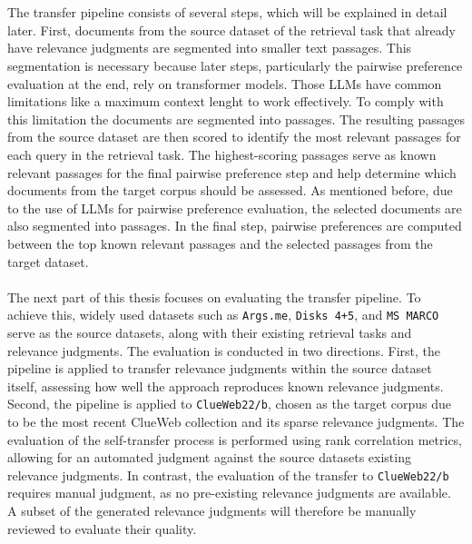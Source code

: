 \\\\
The transfer pipeline consists of several steps, which will be explained in detail later. First, documents from the source dataset of the retrieval task that already have relevance judgments are segmented into smaller text passages. This segmentation is necessary because later steps, particularly the pairwise preference evaluation at the end, rely on transformer models. Those LLMs have common limitations like a maximum context lenght to work effectively. To comply with this limitation the documents are segmented into passages. The resulting passages from the source dataset are then scored to identify the most relevant passages for each query in the retrieval task. The highest-scoring passages serve as known relevant passages for the final pairwise preference step and help determine which documents from the target corpus should be assessed. As mentioned before, due to the use of LLMs for pairwise preference evaluation, the selected documents are also segmented into passages. In the final step, pairwise preferences are computed between the top known relevant passages and the selected passages from the target dataset.
\\\\
The next part of this thesis focuses on evaluating the transfer pipeline. To achieve this, widely used datasets such as \texttt{Args.me}, \texttt{Disks 4+5}, and \texttt{MS MARCO} serve as the source datasets, along with their existing retrieval tasks and relevance judgments. The evaluation is conducted in two directions. First, the pipeline is applied to transfer relevance judgments within the source dataset itself, assessing how well the approach reproduces known relevance judgments. Second, the pipeline is applied to \texttt{ClueWeb22/b}, chosen as the target corpus due to be the most recent ClueWeb collection and its sparse relevance judgments. The evaluation of the self-transfer process is performed using rank correlation metrics, allowing for an automated judgment against the source datasets existing relevance judgments. In contrast, the evaluation of the transfer to \texttt{ClueWeb22/b} requires manual judgment, as no pre-existing relevance judgments are available. A subset of the generated relevance judgments will therefore be manually reviewed to evaluate their quality.